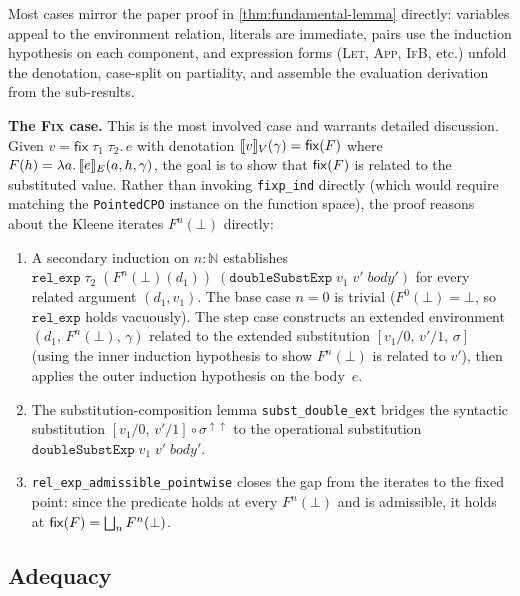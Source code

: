 \noindent
Most cases mirror the paper proof in \cref{thm:fundamental-lemma}
directly: variables appeal to the environment relation, literals are
immediate, pairs use the induction hypothesis on each component, and
expression forms (\textsc{Let}, \textsc{App}, \textsc{IfB}, etc.)
unfold the denotation, case-split on partiality, and assemble the
evaluation derivation from the sub-results.

\medskip

\noindent
\textbf{The \textsc{Fix} case.}\;
This is the most involved case and warrants detailed discussion.
Given $v = \mathsf{fix}\;\tau_1\;\tau_2.\,e$ with denotation
$\llbracket v \rrbracket_V(\gamma) = \mathsf{fix}(F)$ where
$F(h) = \lambda a.\, \llbracket e \rrbracket_E(a, h, \gamma)$, the goal is to show
that $\mathsf{fix}(F)$ is related to the substituted value.  Rather than
invoking \texttt{fixp\_ind} directly (which would require matching the
\HB{} \texttt{PointedCPO} instance on the function space), the proof
reasons about the Kleene iterates $F^n(\bot)$ directly:
\begin{enumerate}
  \item A secondary induction on $n : \mathbb{N}$ establishes
    $\texttt{rel\_exp}\;\tau_2\;(F^n(\bot)(d_1))\;
    (\texttt{doubleSubstExp}\;v_1\;v'\;\mathit{body'})$
    for every related argument $(d_1, v_1)$.
    The base case $n = 0$ is trivial ($F^0(\bot) = \bot$, so
    $\texttt{rel\_exp}$ holds vacuously).  The step case constructs
    an extended environment
    $(d_1,\, F^n(\bot),\, \gamma)$ related to the extended substitution
    $[v_1/0,\, v'/1,\, \sigma]$ (using the inner induction hypothesis
    to show $F^n(\bot)$ is related to $v'$), then applies the
    outer induction hypothesis on the body~$e$.
  \item The substitution-composition lemma
    \texttt{subst\_double\_ext} bridges the syntactic substitution
    $[v_1/0,\, v'/1] \circ \sigma^{\uparrow\uparrow}$
    to the operational substitution
    $\texttt{doubleSubstExp}\;v_1\;v'\;\mathit{body'}$.
  \item \texttt{rel\_exp\_admissible\_pointwise} closes the gap from the
    iterates to the fixed point: since the predicate holds at every
    $F^n(\bot)$ and is admissible, it holds at
    $\mathsf{fix}(F) = \bigsqcup_n F^n(\bot)$.
\end{enumerate}

\subsection*{Adequacy}

